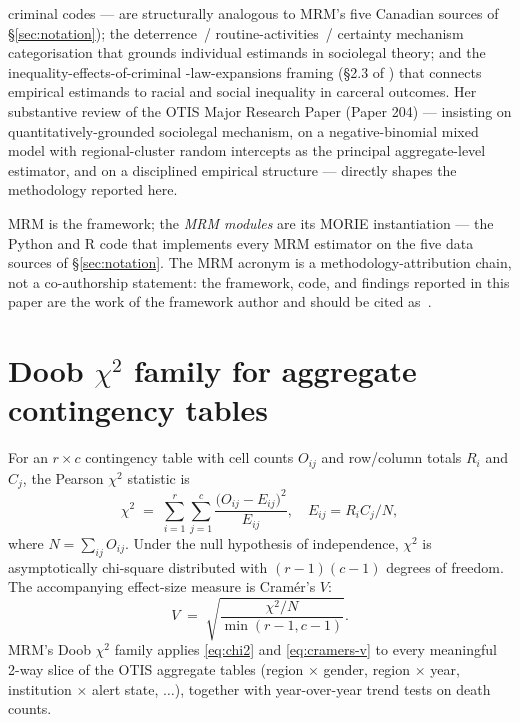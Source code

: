 \documentclass[11pt,a4paper]{article}
\theoremstyle{plain}
\theoremstyle{definition}
\theoremstyle{remark}
\begin{document}
\begin{itemize}
        criminal codes --- are structurally analogous to MRM's
        five Canadian sources of \S\ref{sec:notation}); the
        deterrence~/ routine-activities~/ certainty mechanism
        categorisation that grounds individual estimands in
        sociolegal theory; and the inequality-effects-of-criminal
        -law-expansions framing (\S2.3 of \cite{ZorroMedina2023JMP})
        that connects empirical estimands to racial and social
        inequality in carceral outcomes. Her substantive review of
        the OTIS Major Research Paper (Paper 204) --- insisting on
        quantitatively-grounded sociolegal mechanism, on a
        negative-binomial mixed model with regional-cluster random
        intercepts as the principal aggregate-level estimator, and
        on a disciplined empirical structure --- directly shapes
        the methodology reported here.
\end{itemize}

MRM is the framework; the \emph{MRM modules} are its MORIE
instantiation --- the Python and R code that implements every MRM
estimator on the five data sources of \S\ref{sec:notation}. The
MRM acronym is a methodology-attribution chain, not a
co-authorship statement: the framework, code, and findings
reported in this paper are the work of the framework author and
should be cited as~\cite{Ruhela2026MRM}.

\section{Doob $\chi^{2}$ family for aggregate contingency tables}
\label{sec:doob-chi2}

For an $r \times c$ contingency table with cell counts
$O_{ij}$ and row/column totals $R_{i}$ and $C_{j}$, the Pearson
$\chi^{2}$ statistic is
\begin{equation}
  \chi^{2}
  \;=\;
  \sum_{i=1}^{r} \sum_{j=1}^{c}
  \frac{\bigl(O_{ij} - E_{ij}\bigr)^{2}}{E_{ij}},
  \quad
  E_{ij} = R_{i} C_{j} / N,
  \label{eq:chi2}
\end{equation}
where $N = \sum_{ij} O_{ij}$. Under the null hypothesis of
independence, $\chi^{2}$ is asymptotically chi-square distributed
with $(r-1)(c-1)$ degrees of freedom. The accompanying effect-size
measure is Cram\'er's $V$:
\begin{equation}
  V \;=\; \sqrt{\frac{\chi^{2}/N}{\min(r-1, c-1)}}.
  \label{eq:cramers-v}
\end{equation}
MRM's Doob $\chi^{2}$ family applies \eqref{eq:chi2} and
\eqref{eq:cramers-v} to every meaningful 2-way slice of the OTIS
aggregate tables (region $\times$ gender, region $\times$ year,
institution $\times$ alert state, $\ldots$), together with
year-over-year trend tests on death counts.
\end{document}

